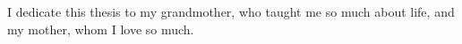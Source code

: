 \mbox{}\\\mbox{}\\\mbox{}\\\mbox{}\\\mbox{}\\ %
\begin{center}
I dedicate this thesis to my grandmother, who taught me so much about life, and my mother, whom I love so much.
\end{center}
